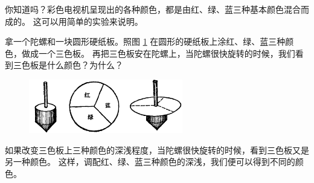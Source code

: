 你知道吗？彩色电视机呈现出的各种颜色，都是由红、绿、蓝三种基本颜色混合而成的。
这可以用简单的实验来说明。

拿一个陀螺和一块圆形硬纸板。照图 \ref{fig:1-35} 在圆形的硬纸板上涂红、绿、蓝三种颜色，做成一个三色板。
再把三色板安在陀螺上，当陀螺很快旋转的时候，我们看到三色板是什么颜色？为什么？

\begin{figure}[htbp]
    \centering
    \includegraphics[width=0.6\textwidth]{../pic/czwl2-ch1-35}
    \caption{}\label{fig:1-35}
\end{figure}

如果改变三色板上三种颜色的深浅程度，当陀螺很快旋转的时候，看到三色板又是另一种颜色。
这样，调配红、绿、蓝三种颜色的深浅，我们便可以得到不同的颜色。


